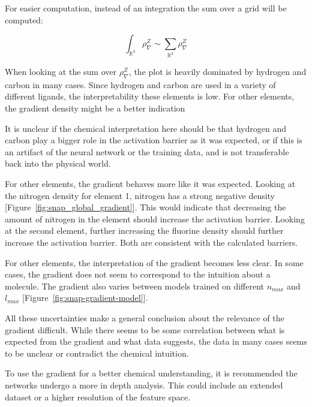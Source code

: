For easier computation, instead of an integration the sum over a grid will be computed: 

$$ \int_{\mathbb{R}^3} \rho_\nabla^Z \sim \sum_{\mathbb{R}^3} \rho_\nabla^Z $$

When looking at the sum over $\rho^Z_\nabla$, the plot is heavily dominated by hydrogen and carbon
in many cases.
Since hydrogen and carbon are used in a variety of different ligands, the interpretability
these elements is low.
For other elements, the gradient density might be a better indication 



It is unclear if the chemical interpretation here should be that hydrogen and carbon play a bigger role in the activation
barrier as it was expected, or if this is an artifact of the neural network or the training data, and is not transferable back into 
the physical world.

For other elements, the gradient behaves more like it was expected.
Looking at the nitrogen density for element 1, nitrogen has a strong negative density [Figure~\ref{fig:snap_global_gradient}].
This would indicate that decreasing the amount of nitrogen in the element should increase the activation barrier.
Looking at the second element, further increasing the fluorine density should further increase the activation barrier.
Both are consistent with the calculated barriers.


For other elements, the interpretation of the gradient becomes less clear.
In some cases, the gradient does not seem to correspond to the intuition about a molecule.
The gradient also varies between models trained on different $n_{max}$ and $l_{max}$ [Figure~\ref{fig:snap-gradient-model}].

All these uncertainties make a general conclusion about the relevance of the gradient difficult.
While there seems to be some correlation between what is expected from the gradient and what data suggests, 
the data in many cases seems to be unclear or contradict the chemical intuition.

To use the gradient for a better chemical understanding, it is recommended the networks undergo a more in depth analysis.
This could include an extended dataset or a higher resolution of the feature space.


